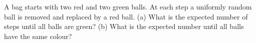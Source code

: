 A bag starts with two red and two green balls. At each step a uniformly random ball is removed and replaced by a red ball. (a) What is the expected number of steps until all balls are green? (b) What is the expected number until all balls have the same colour?
